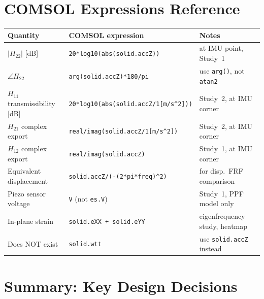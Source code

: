 \documentclass[12pt,a4paper]{article}
\begin{document}
\section{COMSOL Expressions Reference}
\label{sec:exprs}

\begin{center}
\begin{tabular}{lll}
\toprule
Quantity & COMSOL expression & Notes \\
\midrule
$|H_{22}|$ [dB] & \texttt{20*log10(abs(solid.accZ))} & at IMU point, Study~1 \\
$\angle H_{22}$ & \texttt{arg(solid.accZ)*180/pi} & use \texttt{arg()}, not \texttt{atan2} \\
$H_{11}$ transmissibility [dB] & \texttt{20*log10(abs(solid.accZ/1[m/s\^{}2]))} & Study~2, at IMU corner \\
$H_{21}$ complex export & \texttt{real/imag(solid.accZ/1[m/s\^{}2])} & Study~2, at IMU corner \\
$H_{12}$ complex export & \texttt{real/imag(solid.accZ)} & Study~1, at IMU corner \\
Equivalent displacement & \texttt{solid.accZ/(-(2*pi*freq)\^{}2)} & for disp.\ FRF comparison \\
Piezo sensor voltage & \texttt{V} (not \texttt{es.V}) & Study~1, PPF model only \\
In-plane strain & \texttt{solid.eXX + solid.eYY} & eigenfrequency study, heatmap \\
Does NOT exist & \texttt{solid.wtt} & use \texttt{solid.accZ} instead \\
\bottomrule
\end{tabular}
\end{center}

\section{Summary: Key Design Decisions}
\label{sec:summary}
\end{document}
